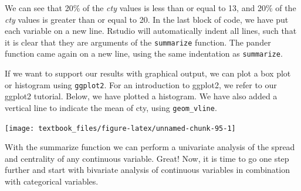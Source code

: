 \documentclass[]{tufte-book}
\newenvironment{Shaded}{}{}
\newcommand{\DataTypeTok}[1]{\textcolor[rgb]{0.56,0.13,0.00}{#1}}
\newcommand{\DecValTok}[1]{\textcolor[rgb]{0.25,0.63,0.44}{#1}}
\newcommand{\FloatTok}[1]{\textcolor[rgb]{0.25,0.63,0.44}{#1}}
\newcommand{\KeywordTok}[1]{\textcolor[rgb]{0.00,0.44,0.13}{\textbf{#1}}}
\newcommand{\NormalTok}[1]{#1}
\newcommand{\OperatorTok}[1]{\textcolor[rgb]{0.40,0.40,0.40}{#1}}
\newcommand{\StringTok}[1]{\textcolor[rgb]{0.25,0.44,0.63}{#1}}
\begin{document}
We can see that 20\% of the \emph{cty} values is less than or equal to 13, and 20\% of the \emph{cty} values is greater than or equal to 20. In the last block of code, we have put each variable on a new line. Rstudio will automatically indent all lines, such that it is clear that they are arguments of the \texttt{summarize} function. The pander function came again on a new line, using the same indentation as \texttt{summarize}.

If we want to support our results with graphical output, we can plot a box plot or histogram using \texttt{ggplot2}. For an introduction to ggplot2, we refer to our ggplot2 tutorial. Below, we have plotted a histogram. We have also added a vertical line to indicate the mean of cty, using \texttt{geom\_vline}.

\begin{Shaded}
\end{Shaded}

\texttt{[image: textbook\_files/figure-latex/unnamed-chunk-95-1]}

With the summarize function we can perform a univariate analysis of the spread and centrality of any continuous variable. Great! Now, it is time to go one step further and start with bivariate analysis of continuous variables in combination with categorical variables.
\end{document}
